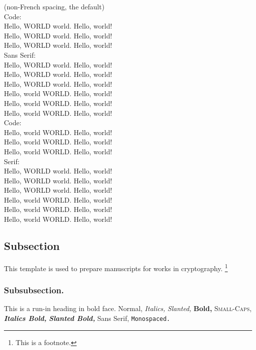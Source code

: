 \nonfrenchspacing
(non-French spacing, the default)\\
{\ttfamily
Code:\\
Hello, WORLD world. Hello, world!\\
Hello, WORLD world\willstop. Hello, world!\\
Hello, WORLD world\wontstop. Hello, world!\\
{\sffamily
Sans Serif:\\
Hello, WORLD world. Hello, world!\\
Hello, WORLD world\willstop. Hello, world!\\
Hello, WORLD world\wontstop. Hello, world!\\
Hello, world WORLD. Hello, world!\\
Hello, world WORLD\willstop. Hello, world!\\
Hello, world WORLD\wontstop. Hello, world!\\
}%
Code:\\
Hello, world WORLD. Hello, world!\\
Hello, world WORLD\willstop. Hello, world!\\
Hello, world WORLD\wontstop. Hello, world!\\
}%
Serif:\\
Hello, WORLD world. Hello, world!\\
Hello, WORLD world\willstop. Hello, world!\\
Hello, WORLD world\wontstop. Hello, world!\\
Hello, world WORLD. Hello, world!\\
Hello, world WORLD\willstop. Hello, world!\\
Hello, world WORLD\wontstop. Hello, world!

\subsection{Subsection}

This template is used to prepare manuscripts for works in cryptography.%
\footnote{This is a footnote.}

\subsubsection{Subsubsection.}
This is a run-in heading in bold face.
Normal,
\textit{Italics,}
\textsl{Slanted,}
\textbf{Bold,}
\textsc{Small-Caps,}
\textit{\textbf{Italics Bold,}}
\textsl{\textbf{Slanted Bold,}}
\textsf{Sans Serif,}
\texttt{Monospaced.}

